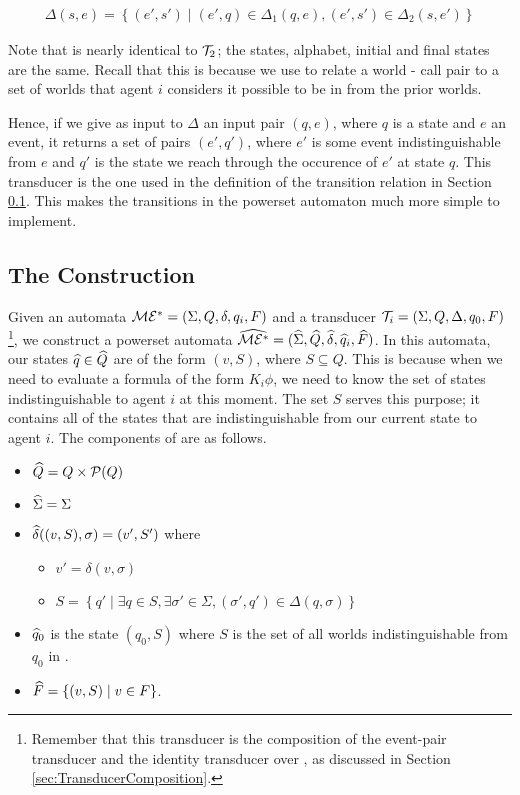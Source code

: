 \documentclass[10pt, a4paper]{report}
\begin{document}
\begin{align*}
  \Delta(s, e) = \left\{ (e', s') \mid (e', q) \in \Delta_1(q, e), (e', s') \in \Delta_2(s, e') \right\} 
\end{align*}

Note that  is nearly identical to $\mathcal{T}_2$; the states, alphabet,
initial and final states are the same. Recall that this is because we use
 to relate a world - call pair to a set of worlds that agent $i$
considers it possible to be in from the prior worlds. 

Hence, if we give as input to $\Delta$ an input pair $(q, e)$, where $q$ is a
state and $e$ an event, it returns a set of pairs $(e', q')$, where $e'$ is some
event indistinguishable from $e$ and $q'$ is the state we reach through the
occurence of $e'$ at state $q$. This transducer is the one used in the
definition of the transition relation in Section \ref{sec:Powerset}. This makes
the transitions in the powerset automaton much more simple to implement.

\subsection{The Construction}
\label{sec:Powerset}

Given an automata $\mathcal{ME^\ast} = (\Sigma, Q, \delta, q_i, F)$ and a transducer
$\mathcal{T}_i = (\Sigma, Q, \Delta, q_0, F)$\footnote{Remember that this transducer
  is the composition of the event-pair transducer and the identity transducer
  over \mestar, as discussed in Section \ref{sec:TransducerComposition}.}, we construct a powerset
automata $\widehat{\mathcal{ME^\ast}} = (\widehat{\Sigma}, \widehat{Q}, \widehat{\delta}, \widehat{q}_i,
\widehat{F})$. In this automata, our states $\widehat{q} \in \widehat{Q}$ are of the form $(v,
S)$, where $S \subseteq Q$. This is because when we need to evaluate a formula
of the form $K_i\phi$, we need to know the set of states indistinguishable
to agent $i$ at this moment. The set $S$ serves this purpose; it contains all of
the states that are indistinguishable from our current state to agent $i$. The
components of \mestar are as follows. 

\begin{itemize}
\item $\widehat{Q} = Q \times \mathcal{P}(Q)$
\item $\widehat{\Sigma} = \Sigma$ 
\item $\widehat{\delta}((v, S), \sigma) = (v', S')$ where
  \begin{itemize}
  \item $v' =  \delta(v, \sigma)$
  \item $S = \left\{q' \mid \exists q \in S, \exists \sigma' \in \Sigma,
      (\sigma', q') \in \Delta(q, \sigma) \right\}$
  \end{itemize}
\item $\widehat{q}_0$ is the state $(q_0, S)$ where $S$ is the set of all worlds
  indistinguishable from $q_0$ in \mestar.
\item $\widehat{F} = \left\{ (v, S) \mid v \in F \right\}$.
\end{itemize}
\end{document}
